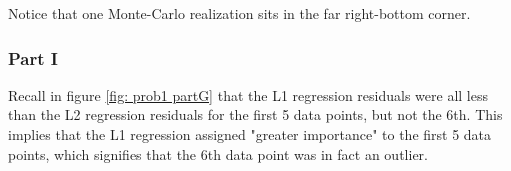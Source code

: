  Notice that one Monte-Carlo realization sits in the far right-bottom corner.

\subsubsection{Part I}

Recall in figure \ref{fig: prob1 partG} that the L1 regression residuals were all less than the L2 regression residuals for the first 5 data points, but not the 6th. This implies that the L1 regression assigned "greater importance" to the first 5 data points, which signifies that the 6th data point was in fact an outlier. 

